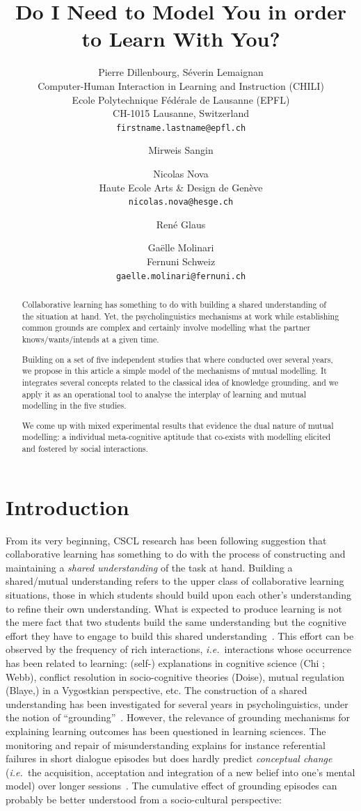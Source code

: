 \documentclass[twocolumn]{article}
\title{Do I Need to Model You in order to Learn With You?}
\author{
    Pierre Dillenbourg, Séverin Lemaignan \\
    \small Computer-Human Interaction in Learning and Instruction (CHILI) \\
    \small Ecole Polytechnique Fédérale de Lausanne (EPFL) \\
    \small CH-1015 Lausanne, Switzerland \\
    {\tt firstname.lastname@epfl.ch}
    \and
    Mirweis Sangin \\
    \and
    Nicolas Nova \\
    \small Haute Ecole Arts \& Design de Genève\\
    {\tt nicolas.nova@hesge.ch}
    \and
    René Glaus
    \and
    Gaëlle Molinari \\
    \small Fernuni Schweiz \\
    {\tt gaelle.molinari@fernuni.ch}
}
\newcommand{\ie}{{\textit{i.e.\ }}}
\begin{document}
\maketitle

\begin{abstract}
    Collaborative learning has something to do with building a shared
    understanding of the situation at hand. Yet, the psycholinguistics mechanisms
    at work while establishing common grounds are complex and certainly involve
    modelling what the partner knows/wants/intends at a given time.

    Building on a set of five independent studies that where conducted over
    several years, we propose in this article a simple model of the mechanisms
    of mutual modelling. It integrates several concepts related to the classical
    idea of knowledge grounding, and we apply it as an operational tool to
    analyse the interplay of learning and mutual modelling in the five studies.

    We come up with mixed experimental results that evidence the dual nature of
    mutual modelling: a individual meta-cognitive aptitude that co-exists with
    modelling elicited and fostered by social interactions.

\end{abstract}

\section{Introduction}


From its very beginning, CSCL research has been following
\citet{roschelle1995construction} suggestion that collaborative learning has
something to do with the process of constructing and maintaining a \emph{shared
understanding} of the task at hand. Building a shared/mutual understanding
refers to the upper class of collaborative learning situations, those in which
students should build upon each other's understanding to refine their own
understanding.  What is expected to produce learning is not the mere fact that
two students build the same understanding but the cognitive effort they have to
engage to build this shared understanding~\citep{schwartz1995emergence}. This
effort can be observed by the frequency of rich interactions, \ie interactions
whose occurrence has been related to learning: (self-) explanations in cognitive
science (Chi ; Webb), conflict resolution in socio-cognitive theories (Doise),
mutual regulation (Blaye,) in a Vygostkian perspective, etc. The construction of
a shared understanding has been investigated for several years in
psycholinguistics, under the  notion of
``grounding''~\citep{clark1986referring}.  However, the relevance of grounding
mechanisms for explaining learning outcomes has been questioned in learning
sciences. The monitoring and repair of misunderstanding explains for instance
referential failures in short dialogue episodes but does hardly predict
\emph{conceptual change} (\ie the acquisition, acceptation and integration of a
new belief into one's mental model) over longer
sessions~\cite{dillenbourg2006sharing}. The cumulative effect of grounding
episodes can probably be better understood from a socio-cultural perspective:
\end{document}
